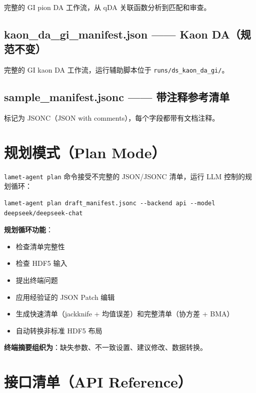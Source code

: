 \documentclass[12pt,a4paper]{ctexart}
\begin{document}
完整的 GI pion DA 工作流，从 qDA 关联函数分析到匹配和审查。

\subsection{kaon\_da\_gi\_manifest.json —— Kaon DA（规范不变）}

完整的 GI kaon DA 工作流，运行辅助脚本位于 \texttt{runs/ds\_kaon\_da\_gi/}。

\subsection{sample\_manifest.jsonc —— 带注释参考清单}

标记为 JSONC（JSON with comments），每个字段都带有文档注释。

\section{规划模式（Plan Mode）}

\texttt{lamet-agent plan} 命令接受不完整的 JSON/JSONC 清单，运行 LLM 控制的规划循环：

\begin{lstlisting}[style=bashcode]
lamet-agent plan draft_manifest.jsonc --backend api --model deepseek/deepseek-chat
\end{lstlisting}

\textbf{规划循环功能}：
\begin{itemize}[itemsep=2pt]
    \item 检查清单完整性
    \item 检查 HDF5 输入
    \item 提出终端问题
    \item 应用经验证的 JSON Patch 编辑
    \item 生成快速清单（jackknife + 均值误差）和完整清单（协方差 + BMA）
    \item 自动转换非标准 HDF5 布局
\end{itemize}

\textbf{终端摘要组织为}：缺失参数、不一致设置、建议修改、数据转换。

\section{接口清单（API Reference）}
\end{document}
